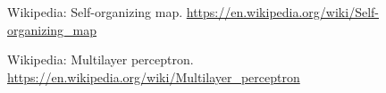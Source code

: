 \documentclass[10pt, a4paper,spanish]{article}
\begin{document}
	\begin{thebibliography}{9}

		Wikipedia: Self-organizing map.  \url{https://en.wikipedia.org/wiki/Self-organizing_map}

		Wikipedia: Multilayer perceptron.  \url{https://en.wikipedia.org/wiki/Multilayer_perceptron}

	\end{thebibliography}
\end{document}
